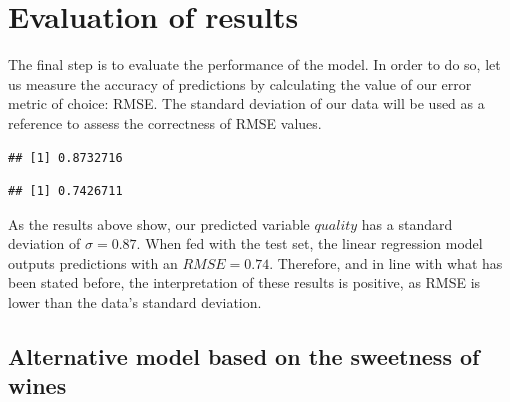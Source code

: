 \documentclass[12pt,]{article}
\newenvironment{Shaded}{\begin{snugshade}}{\end{snugshade}}
\newcommand{\KeywordTok}[1]{\textcolor[rgb]{0.13,0.29,0.53}{\textbf{{#1}}}}
\newcommand{\DecValTok}[1]{\textcolor[rgb]{0.00,0.00,0.81}{{#1}}}
\newcommand{\StringTok}[1]{\textcolor[rgb]{0.31,0.60,0.02}{{#1}}}
\newcommand{\CommentTok}[1]{\textcolor[rgb]{0.56,0.35,0.01}{\textit{{#1}}}}
\newcommand{\NormalTok}[1]{{#1}}
\begin{document}
\section{Evaluation of results}\label{evaluation-of-results}

The final step is to evaluate the performance of the model. In order to
do so, let us measure the accuracy of predictions by calculating the
value of our error metric of choice: RMSE. The standard deviation of our
data will be used as a reference to assess the correctness of RMSE
values.

\begin{Shaded}
\end{Shaded}

\begin{verbatim}
## [1] 0.8732716
\end{verbatim}

\begin{Shaded}
\end{Shaded}

\begin{verbatim}
## [1] 0.7426711
\end{verbatim}

As the results above show, our predicted variable \(quality\) has a
standard deviation of \(\sigma = 0.87\). When fed with the test set, the
linear regression model outputs predictions with an \(RMSE = 0.74\).
Therefore, and in line with what has been stated before, the
interpretation of these results is positive, as RMSE is lower than the
data's standard deviation.

\subsection{Alternative model based on the sweetness of
wines}\label{alternative-model-based-on-the-sweetness-of-wines}
\end{document}
